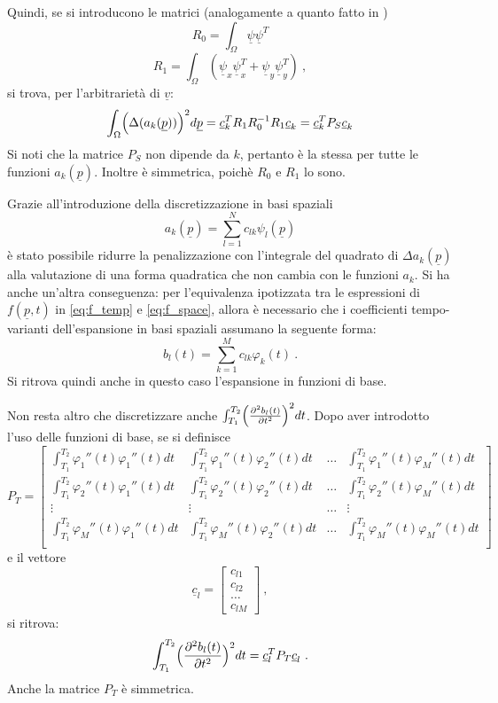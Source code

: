 \documentclass[a4paper,11pt,twoside,openright]{book}							%
\begin{document}
Quindi, se si introducono le matrici (analogamente a quanto fatto in \cite{art:sangalli})
$$ R_0 = \int_\Omega \underline \psi \underline \psi^T $$
$$ R_1 = \int_\Omega (\underline \psi_x \underline \psi_x^T + \underline \psi_y \underline \psi_y^T) \ ,$$
si trova, per l'arbitrarietà di $\underline v$:
\begin{equation}
\label{eq:pspace}
\int_{\Omega} \Bigl( \Delta(  a_k(\underline p)  ) \Bigr)^2 d \underline p = \underline{c}_k^T R_1 R_0^{-1} R_1 \underline{c}_k=\underline{c}_k^T P_S \underline{c}_k
\end{equation}
Si noti che la matrice $P_S$ non dipende da $k$, pertanto è la stessa per tutte le funzioni $a_k(\underline{p})$. Inoltre è simmetrica, poichè $R_0$ e $R_1$ lo sono.

Grazie all'introduzione della discretizzazione in basi spaziali
$$
a_k(\underline p)=\sum_{l=1}^N c_{lk}\psi_l(\underline p)
$$
è stato possibile ridurre la penalizzazione con l'integrale del quadrato di $\Delta a_k(\underline p)$
alla valutazione di una forma quadratica che non cambia con le funzioni $a_k$. Si ha anche un'altra conseguenza: per l'equivalenza ipotizzata tra le espressioni di $f(\underline{p},t)$ in \ref{eq:f_temp} e \ref{eq:f_space}, allora è necessario che i coefficienti tempo-varianti dell'espansione in basi spaziali assumano la seguente forma:
$$
b_l(t)=\sum_{k=1}^M c_{lk}\varphi_k(t) \ .
$$
Si ritrova quindi anche in questo caso l'espansione in funzioni di base.

Non resta altro che discretizzare anche $\int_{T_1}^{T_2} \Bigl( \frac{\partial^2   b_l(t)   }{\partial t ^2} \Bigr)^2 dt$. Dopo aver introdotto l'uso delle funzioni di base, se si definisce 
 $$ P_T = \begin{bmatrix}
\int_{T_1}^{T_2} \varphi_1''(t) \varphi_1''(t) dt  & \int_{T_1}^{T_2} \varphi_1''(t) \varphi_2''(t) dt & \hdots & \int_{T_1}^{T_2} \varphi_1''(t) \varphi_M''(t) dt  \\
\int_{T_1}^{T_2} \varphi_2''(t) \varphi_1''(t) dt  & \int_{T_1}^{T_2} \varphi_2''(t) \varphi_2''(t) dt & \hdots & \int_{T_1}^{T_2} \varphi_2''(t) \varphi_M''(t) dt  \\
\vdots & \vdots & \hdots & \vdots \\
\int_{T_1}^{T_2} \varphi_M''(t) \varphi_1''(t) dt  & \int_{T_1}^{T_2} \varphi_M''(t) \varphi_2''(t) dt & \hdots & \int_{T_1}^{T_2} \varphi_M''(t) \varphi_M''(t) dt  \\
\end{bmatrix} $$
e il vettore $$
\underline{c}_l =
\begin{bmatrix}
c_{l1} \\ c_{l2} \\ \hdots \\ c_{lM}
\end{bmatrix} \ ,$$ si ritrova:
$$
\int_{T_1}^{T_2} \Bigl( \frac{\partial^2   b_l(t)   }{\partial t ^2} \Bigr)^2 dt = \underline{c}_l^T  P_T \underline{c}_l \ .
$$
Anche la matrice $P_T$ è simmetrica.
\end{document}
